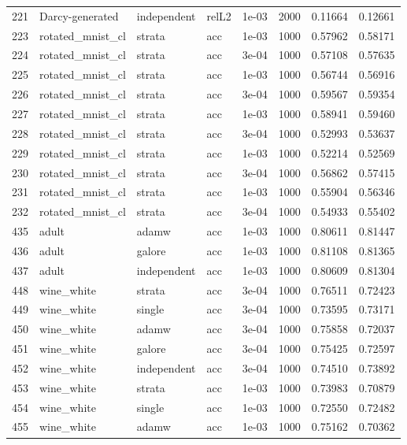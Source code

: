 \begin{longtable}{rlllrrrr}
221 & Darcy-generated & independent & relL2 & 1e-03 & 2000 & 0.11664 & 0.12661 \\
\rowcolor{oursbg}
223 & rotated\_mnist\_cl & strata & acc & 1e-03 & 1000 & 0.57962 & 0.58171 \\
224 & rotated\_mnist\_cl & strata & acc & 3e-04 & 1000 & 0.57108 & 0.57635 \\
\rowcolor{oursbg}
225 & rotated\_mnist\_cl & strata & acc & 1e-03 & 1000 & 0.56744 & 0.56916 \\
226 & rotated\_mnist\_cl & strata & acc & 3e-04 & 1000 & 0.59567 & 0.59354 \\
\rowcolor{oursbg}
227 & rotated\_mnist\_cl & strata & acc & 1e-03 & 1000 & 0.58941 & 0.59460 \\
228 & rotated\_mnist\_cl & strata & acc & 3e-04 & 1000 & 0.52993 & 0.53637 \\
\rowcolor{oursbg}
229 & rotated\_mnist\_cl & strata & acc & 1e-03 & 1000 & 0.52214 & 0.52569 \\
230 & rotated\_mnist\_cl & strata & acc & 3e-04 & 1000 & 0.56862 & 0.57415 \\
\rowcolor{oursbg}
231 & rotated\_mnist\_cl & strata & acc & 1e-03 & 1000 & 0.55904 & 0.56346 \\
232 & rotated\_mnist\_cl & strata & acc & 3e-04 & 1000 & 0.54933 & 0.55402 \\
435 & adult & adamw & acc & 1e-03 & 1000 & 0.80611 & 0.81447 \\
436 & adult & galore & acc & 1e-03 & 1000 & 0.81108 & 0.81365 \\
437 & adult & independent & acc & 1e-03 & 1000 & 0.80609 & 0.81304 \\
\rowcolor{oursbg}
448 & wine\_white & strata & acc & 3e-04 & 1000 & 0.76511 & 0.72423 \\
449 & wine\_white & single & acc & 3e-04 & 1000 & 0.73595 & 0.73171 \\
450 & wine\_white & adamw & acc & 3e-04 & 1000 & 0.75858 & 0.72037 \\
451 & wine\_white & galore & acc & 3e-04 & 1000 & 0.75425 & 0.72597 \\
452 & wine\_white & independent & acc & 3e-04 & 1000 & 0.74510 & 0.73892 \\
\rowcolor{oursbg}
453 & wine\_white & strata & acc & 1e-03 & 1000 & 0.73983 & 0.70879 \\
454 & wine\_white & single & acc & 1e-03 & 1000 & 0.72550 & 0.72482 \\
455 & wine\_white & adamw & acc & 1e-03 & 1000 & 0.75162 & 0.70362 \\

\end{longtable}
